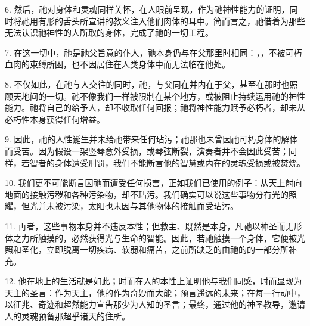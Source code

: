 6. 然后，祂对身体和灵魂同样关怀，在人眼前呈现，作为祂神性能力的证明，同时将祂用有形的舌头所宣讲的教义注入他们肉体的耳中。简而言之，祂借着为那些无法认识祂神性的人所取的身体，完成了祂的一切工程。\par

7. 在这一切中，祂是祂父旨意的仆人，祂本身仍与在父那里时相同：，，不被可朽血肉的束缚所困，也不因居住在人类身体中而无法临在他处。\par

8. 不仅如此，在祂与人交往的同时，祂，与父同在并内在于父，甚至在那时也照顾天地间的一切。祂不像我们一样被限制在某个地方，或被阻止持续运用祂的神性能力。祂将自己的给予人，却不收取任何回报；祂将神性能力赋予必朽者，却未从必朽性本身获得任何增益。\par

9. 因此，祂的人性诞生并未给祂带来任何玷污；祂那也未曾因祂可朽身体的解体而受苦。因为假设一架竖琴意外受损，或琴弦断裂，演奏者并不会因此受苦；同样，若智者的身体遭受刑罚，我们不能断言他的智慧或内在的灵魂受损或被焚烧。\par

10. 我们更不可能断言因祂而遭受任何损害，正如我们已使用的例子：从天上射向地面的接触污秽和各种污染物，却不玷污。我们确实可以说这些事物分有光的照耀，但光并未被污染，太阳也未因与其他物体的接触而受玷污。\par

11. 再者，这些事物本身并不违反本性；但救主、既然是本身，凡祂以神圣而无形体之力所触摸的，必然获得光与生命的智能。因此，若祂触摸一个身体，它便被光照和圣化，立即脱离一切疾病、软弱和痛苦，之前所缺乏的由祂的的一部分所补充。\par

12. 他在地上的生活就是如此；时而在人的本性上证明他与我们同感，时而显现为天主的圣言：作为天主，他的作为奇妙而大能；预言遥远的未来；在每一行动中，以征兆、奇迹和超然能力宣告那少为人知的圣言；最终，通过他的神圣教导，邀请人的灵魂预备那超乎诸天的住所。\par


